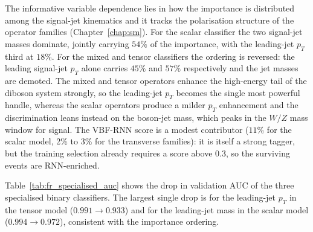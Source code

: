 The informative variable dependence lies in how the importance is distributed among the signal-jet kinematics and it tracks the polarisation structure of the operator families (Chapter~\ref{chap:sm}). For the scalar classifier the two signal-jet masses dominate, jointly carrying $54\%$ of the importance, with the leading-jet $p_T$ third at $18\%$. For the mixed and tensor classifiers the ordering is reversed: the leading signal-jet $p_T$ alone carries $45\%$ and $57\%$ respectively and the jet masses are demoted. The mixed and tensor operators enhance the high-energy tail of the diboson system strongly, so the leading-jet $p_T$ becomes the single most powerful handle, whereas the scalar operators produce a milder $p_T$ enhancement and the discrimination leans instead on the boson-jet mass, which peaks in the $W/Z$ mass window for signal. The VBF-RNN score is a modest contributor ($11\%$ for the scalar model, 2\% to 3\% for the transverse families): it is itself a strong tagger, but the training selection already requires a score above $0.3$, so the surviving events are RNN-enriched.

Table~\ref{tab:fr_specialised_auc} shows the drop in validation AUC of the three specialised binary classifiers. The largest single drop is for the leading-jet $p_T$ in the tensor model ($0.991\to0.933$) and for the leading-jet mass in the scalar model ($0.994\to0.972$), consistent with the importance ordering.

